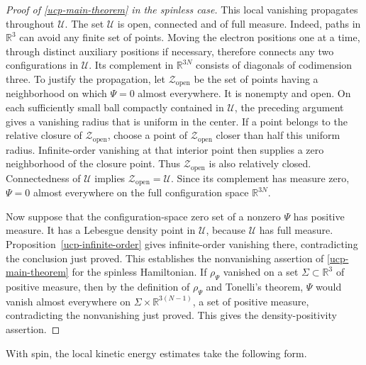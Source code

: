 \documentclass[final,reqno]{amsart}
\theoremstyle{remark}
\newcommand{\RR}{\mathbb{R}}
\begin{document}
\begin{proof}[Proof of \cref{ucp-main-theorem} in the spinless case]
This local vanishing propagates throughout $\mathcal U$.
The set $\mathcal U$ is open, connected and of full measure.
Indeed, paths in $\RR^3$ can avoid any
finite set of points.  Moving the electron positions one at a time,
through distinct auxiliary positions if necessary, therefore connects
any two configurations in $\mathcal U$.  Its complement in
$\RR^{3N}$ consists of diagonals of codimension three.
To justify the propagation, let $\mathcal Z_\mathrm{open}$ be the set of points
having a neighborhood on which $\Psi=0$ almost everywhere.
It is nonempty and open.  On each sufficiently small ball compactly
contained in $\mathcal U$, the preceding argument gives a vanishing
radius that is uniform in the center.  If a point belongs to the
relative closure of $\mathcal Z_\mathrm{open}$, choose a point of
$\mathcal Z_\mathrm{open}$ closer than half this uniform radius.
Infinite-order vanishing at that interior point then supplies a zero
neighborhood of the closure point.  Thus $\mathcal Z_\mathrm{open}$ is also
relatively closed.  Connectedness of $\mathcal U$ implies
$\mathcal Z_\mathrm{open}=\mathcal U$.  Since its complement has measure zero,
$\Psi=0$ almost everywhere on the full configuration space $\RR^{3N}$.

Now suppose that the configuration-space zero set of a nonzero
$\Psi$ has positive measure.  It has a Lebesgue density point in
$\mathcal U$, because $\mathcal U$ has full measure.
Proposition~\ref{ucp-infinite-order} gives infinite-order vanishing
there, contradicting the conclusion just proved.  This establishes
the nonvanishing assertion of \cref{ucp-main-theorem} for the
spinless Hamiltonian.
If $\rho_\Psi$ vanished on a set $\Sigma\subset\RR^3$ of positive measure,
then by the definition of $\rho_\Psi$ and Tonelli's theorem, $\Psi$ would
vanish almost everywhere on $\Sigma\times\RR^{3(N-1)}$, a set of positive
measure, contradicting the nonvanishing just proved.  This gives the
density-positivity assertion.
\end{proof}

With spin, the local kinetic energy estimates take the following form.
\end{document}
